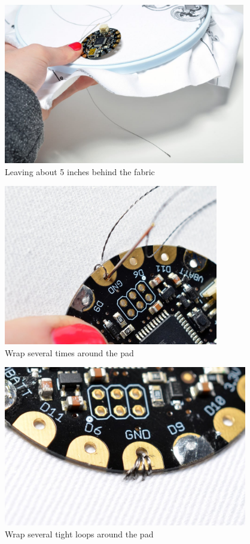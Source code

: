 \documentclass[letterpaper,twoside,12pt]{article}
\begin{document}
\begin{figure}[hbpt]\begin{centering}%
\includegraphics[height=2.75in]{flora_DSC_0101.jpg}
\caption{Leaving about 5 inches behind the fabric}
\label{fig:flora_DSC_0101}
\end{centering}\end{figure}
\begin{figure}[hbpt]\begin{centering}%
\includegraphics[height=2.75in]{flora_DSC_0103.jpg}
\caption{Wrap several times around the pad}
\label{fig:flora_DSC_0103}
\end{centering}\end{figure}
\begin{figure}[hbpt]\begin{centering}%
\includegraphics[height=2.75in]{flora_DSC_0105.jpg}
\caption{Wrap several tight loops around the pad}
\label{fig:flora_DSC_0105}
\end{centering}\end{figure}
\end{document}
